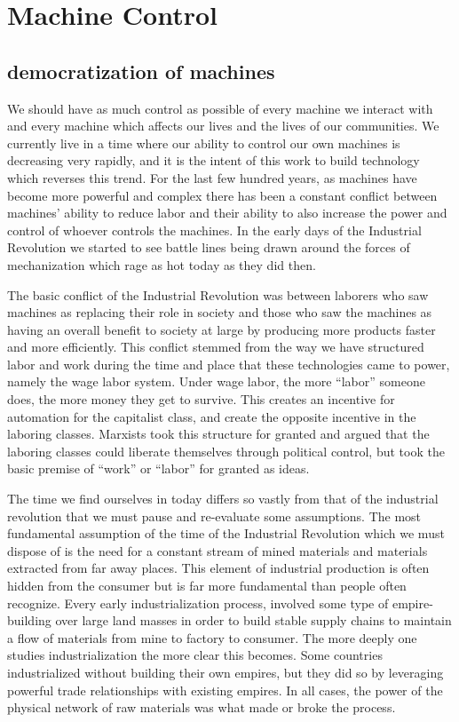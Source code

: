 \section{Machine Control}

\subsection{democratization of machines}

We should have as much control as possible of every machine we interact with and every machine which affects our lives and the lives of our communities.  We currently live in a time where our ability to control our own machines is decreasing very rapidly, and it is the intent of this work to build technology which reverses this trend. For the last few hundred years, as machines have become more powerful and complex there has been a constant conflict between machines' ability to reduce labor and their ability to also increase the power and control of whoever controls the machines.  In the early days of the Industrial Revolution we started to see battle lines being drawn around the forces of mechanization which rage as hot today as they did then.

The basic conflict of the Industrial Revolution was between laborers who saw machines as replacing their role in society and those who saw the machines as having an overall benefit to society at large by producing more products faster and more efficiently.  This conflict stemmed from the way we have structured labor and work during the time and place that these technologies came to power, namely the wage labor system.  Under wage labor, the more ``labor'' someone does, the more money they get to survive.  This creates an incentive for automation for the capitalist class, and create the opposite incentive in the laboring classes.  Marxists took this structure for granted and argued that the laboring classes could liberate themselves through political control, but took the basic premise of ``work'' or ``labor'' for granted as ideas.  

The time we find ourselves in today differs so vastly from that of the industrial revolution that we must pause and re-evaluate some assumptions.  The most fundamental assumption of the time of the Industrial Revolution which we must dispose of is the need for a constant stream of mined materials and materials extracted from far away places.  This element of industrial production is often hidden from the consumer but is far more fundamental than people often recognize.  Every early industrialization process, involved some type of empire-building over large land masses in order to build stable supply chains to maintain a flow of materials from mine to factory to consumer.  The more deeply one studies industrialization the more clear this becomes. Some countries industrialized without building their own empires, but they did so by leveraging powerful trade relationships with existing empires.  In all cases, the power of the physical network of raw materials was what made or broke the process. 

